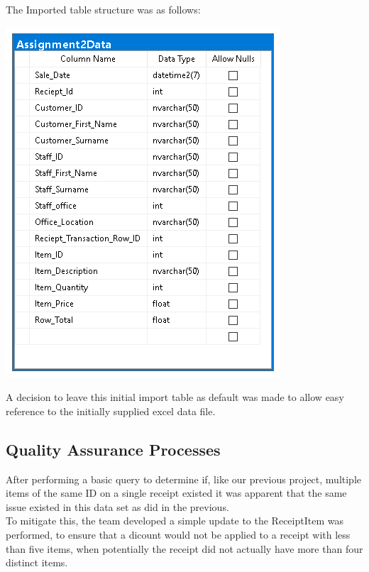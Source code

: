\documentclass{article}
\begin{document}
		\vspace{2mm}        
        
        The Imported table structure was as follows:

		\vspace{2mm}
		
        \begin{center}
            \includegraphics{Images/Initial_Import.PNG}
        \end{center}
		
		\vspace{5mm}		
		
        A decision to leave this initial import table as default
        was made to allow easy reference to the initially supplied
        excel data file.

\newpage
        

        \subsection{Quality Assurance Processes}
        \label{sec:QAP}
        After performing a basic query to determine if, like our previous project, multiple 
        items of the same ID on a single receipt existed it was 
        apparent that the same issue existed in this data set as did in the previous.
        \\
        To mitigate this, the team developed a simple update to the 
        ReceiptItem was performed, to ensure that a dicount would not be applied to a receipt with 
        less than five items, when potentially the receipt did not 
        actually have more than four distinct items. \\
        
\end{document}

